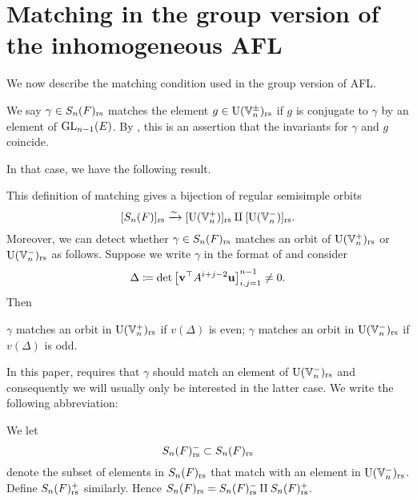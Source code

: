 \section{Matching in the group version of the inhomogeneous AFL}
We now describe the matching condition used in the group version of AFL.
\begin{definition}
  We say $\gamma \in S_n(F)_{\mathrm{rs}}$ matches the element $g \in \operatorname{U}(\mathbb V_n^\pm)_{\mathrm{rs}}$
  if $g$ is conjugate to $\gamma$ by an element of $\operatorname{GL}_{n-1}(E)$.
  By , this is an assertion that
  the invariants for $\gamma$ and $g$ coincide.
  \label{def:matching_inhomog}
\end{definition}
In that case, we have the following result.
\begin{proposition}
  \label{prop:valuation_delta_matching_group}
  This definition of matching gives
  a bijection of regular semisimple orbits
  \[ [S_n(F)]_{\mathrm{rs}} \xrightarrow{\sim} [\operatorname{U}(\mathbb V_n^+)]_{\mathrm{rs}} \amalg [\operatorname{U}(\mathbb V_n^-)]_{\mathrm{rs}}. \]
  Moreover, we can detect whether $\gamma \in S_n(F)_{\mathrm{rs}}$ matches an orbit of
  $\operatorname{U}(\mathbb V_n^+)_{\mathrm{rs}}$ or $\operatorname{U}(\mathbb V_n^-)_{\mathrm{rs}}$ as follows.
  Suppose we write $\gamma$ in the format of  and consider
  \[ \Delta \coloneqq \det \left[ \mathbf v^\top A^{i+j-2} \mathbf u \right]_{i,j=1}^{n-1} \neq 0. \]
  Then
  \begin{itemize}
    \ii $\gamma$ matches an orbit in $\operatorname{U}(\mathbb V_n^+)_{\mathrm{rs}}$ if $v(\Delta)$ is even;
    \ii $\gamma$ matches an orbit in $\operatorname{U}(\mathbb V_n^-)_{\mathrm{rs}}$ if $v(\Delta)$ is odd.
  \end{itemize}
\end{proposition}
In this paper, 
requires that $\gamma$ should match an element of $\operatorname{U}(\mathbb V_n^-)_{\mathrm{rs}}$
and consequently we will usually only be interested in the latter case.
We write the following abbreviation:
\begin{definition}
  [$S_n(F)\rs^\pm$]
  We let \[ S_n(F)_{\mathrm{rs}}^- \subset S_n(F)_{\mathrm{rs}} \]
  denote the subset of elements in $S_n(F)_{\mathrm{rs}}$ that match
  with an element in $\operatorname{U}(\mathbb V_n^-)_{\mathrm{rs}}$.
  Define $S_n(F)_{\mathrm{rs}}^+$ similarly.
  Hence $S_n(F)_{\mathrm{rs}} = S_n(F)_{\mathrm{rs}}^- \amalg S_n(F)_{\mathrm{rs}}^+$.
\end{definition}


